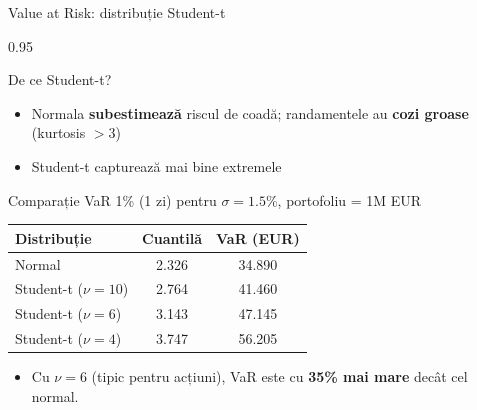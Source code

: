 \documentclass[9pt, aspectratio=169, t]{beamer}
\begin{document}
\begin{frame}{Value at Risk: distribuție Student-t}
    \small
    \begin{cminipage}{0.95\textwidth}
        \begin{block}{De ce Student-t?}
            \begin{itemize}\setlength{\itemsep}{0pt}
                \item Normala \textbf{subestimează} riscul de coadă; randamentele au \textbf{cozi groase} (kurtosis $> 3$)
                \item Student-t capturează mai bine extremele
            \end{itemize}
        \end{block}
        \vspace{-0.2cm}
        \begin{exampleblock}{Comparație VaR 1\% (1 zi) pentru $\sigma = 1.5\%$, portofoliu = 1M EUR}
            \begin{center}
                \begin{tabular}{lcc}
                    \toprule
                    \textbf{Distribuție} & \textbf{Cuantilă} & \textbf{VaR (EUR)} \\
                    \midrule
                    Normal & 2.326 & 34.890 \\
                    Student-t ($\nu = 10$) & 2.764 & 41.460 \\
                    Student-t ($\nu = 6$) & 3.143 & 47.145 \\
                    Student-t ($\nu = 4$) & 3.747 & 56.205 \\
                    \bottomrule
                \end{tabular}
            \end{center}
            \begin{itemize}\setlength{\itemsep}{0pt}
                \item Cu $\nu = 6$ (tipic pentru acțiuni), VaR este cu \textbf{35\% mai mare} decât cel normal.
            \end{itemize}
        \end{exampleblock}
    \end{cminipage}
\end{frame}
\end{document}
